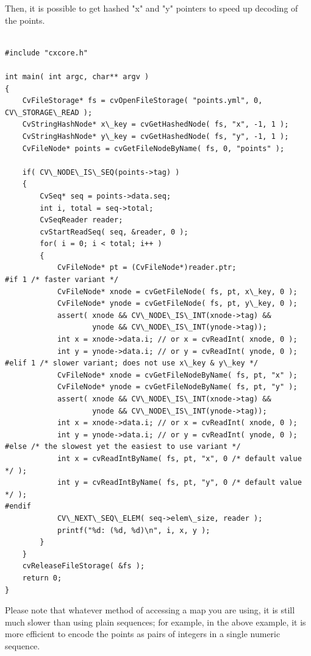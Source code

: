 Then, it is possible to get hashed "x" and "y" pointers to speed up decoding of the points.

\begin{lstlisting}

#include "cxcore.h"

int main( int argc, char** argv )
{
    CvFileStorage* fs = cvOpenFileStorage( "points.yml", 0, CV\_STORAGE\_READ );
    CvStringHashNode* x\_key = cvGetHashedNode( fs, "x", -1, 1 );
    CvStringHashNode* y\_key = cvGetHashedNode( fs, "y", -1, 1 );
    CvFileNode* points = cvGetFileNodeByName( fs, 0, "points" );

    if( CV\_NODE\_IS\_SEQ(points->tag) )
    {
        CvSeq* seq = points->data.seq;
        int i, total = seq->total;
        CvSeqReader reader;
        cvStartReadSeq( seq, &reader, 0 );
        for( i = 0; i < total; i++ )
        {
            CvFileNode* pt = (CvFileNode*)reader.ptr;
#if 1 /* faster variant */
            CvFileNode* xnode = cvGetFileNode( fs, pt, x\_key, 0 );
            CvFileNode* ynode = cvGetFileNode( fs, pt, y\_key, 0 );
            assert( xnode && CV\_NODE\_IS\_INT(xnode->tag) &&
                    ynode && CV\_NODE\_IS\_INT(ynode->tag));
            int x = xnode->data.i; // or x = cvReadInt( xnode, 0 );
            int y = ynode->data.i; // or y = cvReadInt( ynode, 0 );
#elif 1 /* slower variant; does not use x\_key & y\_key */
            CvFileNode* xnode = cvGetFileNodeByName( fs, pt, "x" );
            CvFileNode* ynode = cvGetFileNodeByName( fs, pt, "y" );
            assert( xnode && CV\_NODE\_IS\_INT(xnode->tag) &&
                    ynode && CV\_NODE\_IS\_INT(ynode->tag));
            int x = xnode->data.i; // or x = cvReadInt( xnode, 0 );
            int y = ynode->data.i; // or y = cvReadInt( ynode, 0 );
#else /* the slowest yet the easiest to use variant */
            int x = cvReadIntByName( fs, pt, "x", 0 /* default value */ );
            int y = cvReadIntByName( fs, pt, "y", 0 /* default value */ );
#endif
            CV\_NEXT\_SEQ\_ELEM( seq->elem\_size, reader );
            printf("%d: (%d, %d)\n", i, x, y );
        }
    }
    cvReleaseFileStorage( &fs );
    return 0;
}

\end{lstlisting}

Please note that whatever method of accessing a map you are using, it is
still much slower than using plain sequences; for example, in the above
example, it is more efficient to encode the points as pairs of integers
in a single numeric sequence.

